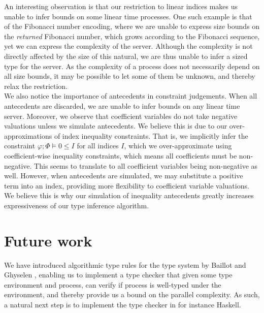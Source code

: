 An interesting observation is that our restriction to linear indices makes us unable to infer bounds on some linear time processes. One such example is that of the Fibonacci number encoding, where we are unable to express size bounds on the \textit{returned} Fibonacci number, which grows according to the Fibonacci sequence, yet we can express the complexity of the server. Although the complexity is not directly affected by the size of this natural, we are thus unable to infer a sized type for the server. As the complexity of a process does not necessarily depend on all size bounds, it may be possible to let some of them be unknown, and thereby relax the restriction.\\

We also notice the importance of antecedents in constraint judgements. When all antecedents are discarded, we are unable to infer bounds on any linear time server. Moreover, we observe that coefficient variables do not take negative valuations unless we simulate antecedents. We believe this is due to our over-approximations of index inequality constraints. That is, we implicitly infer the constraint $\varphi;\Phi\vDash 0 \leq I$ for all indices $I$, which we over-approximate using coefficient-wise inequality constraints, which means all coefficients must be non-negative. This seems to translate to all coefficient variables being non-negative as well. However, when antecedents are simulated, we may substitute a positive term into an index, providing more flexibility to coefficient variable valuations. We believe this is why our simulation of inequality antecedents greatly increases expressiveness of our type inference algorithm.




\section{Future work}
We have introduced algorithmic type rules for the type system by Baillot and Ghyselen \cite{BaillotGhyselen2021}, enabling us to implement a type checker that given some type environment and process, can verify if process is well-typed under the environment, and thereby provide us a bound on the parallel complexity. As such, a natural next step is to implement the type checker in for instance Haskell.\\

